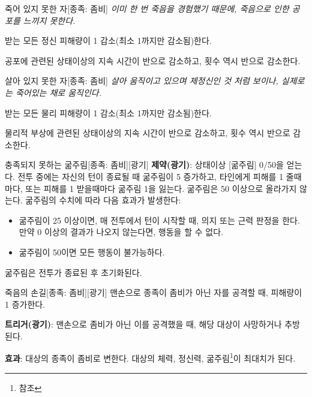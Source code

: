 \documentclass{report}
\begin{document}
	\begin{story}{죽어 있지 못한 자}{[종족: 좀비]}
		\textit{이미 한 번 죽음을 경험했기 때문에, 죽음으로 인한 공포를 느끼지 못한다.}
		
		받는 모든 정신 피해량이 1 감소(최소 1까지만 감소됨)한다.
		
		공포에 관련된 상태이상의 지속 시간이 반으로 감소하고, 횟수 역시 반으로 감소한다.
		
		\smallskip
		
	\end{story}
	
	\begin{story}{살아 있지 못한 자}{[종족: 좀비]}
		\textit{살아 움직이고 있으며 제정신인 것 처럼 보이나, 실제로는 죽어있는 채로 움직인다.}
		
		받는 모든 물리 피해량이 1 감소(최소 1까지만 감소됨)한다.
		
		물리적 부상에 관련된 상태이상의 지속 시간이 반으로 감소하고, 횟수 역시 반으로 감소한다.
		
	\end{story}
	
	\begin{story}{충족되지 못하는 굶주림}{[종족: 좀비][광기]}
		\textbf{제약(광기)}: 상태이상 [굶주림] 0/50을 얻는다. 전투 중에는 자신의 턴이 종료될 때 굶주림이 5 증가하고, 타인에게 피해를 1 줄때마다, 또는 피해를 1 받을때마다 굶주림 1을 잃는다. 굶주림은 50 이상으로 올라가지 않는다. 굶주림의 수치에 따라 다음 효과가 발생한다:
		\begin{itemize}
			\item 굶주림이 25 이상이면, 매 전투에서 턴이 시작할 때, 의지 또는 근력 판정을 한다. 만약 0 이상의 결과가 나오지 않는다면, 행동을 할 수 없다.
			\item 굶주림이 50이면 모든 행동이 불가능하다.
		\end{itemize}
		굶주림은 전투가 종료된 후 초기화된다.
		
	\end{story}
	
	\begin{story}{죽음의 손길}{[종족: 좀비][광기]}
		맨손으로 종족이 좀비가 아닌 자를 공격할 때, 피해량이 1 증가한다.
		
		\textbf{트리거(광기)}: 맨손으로 좀비가 아닌 이를 공격했을 때, 해당 대상이 사망하거나 추방된다.
		
		\textbf{효과}: 대상의 종족이 좀비로 변한다. 대상의 체력, 정신력, 굶주림\footnote{ 참조}이 최대치가 된다.
		
	\end{story}
\end{document}
